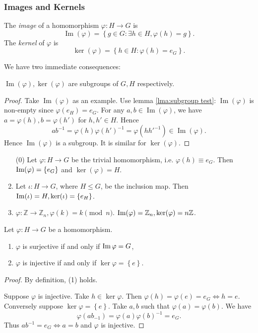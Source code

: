 \documentclass[a4paper]{article}
\begin{document}
\subsubsection{Images and Kernels}
\begin{definition}
  The \textit{image} of a homomorphism $ \varphi: H \to G $ is
  \[
    \operatorname{Im}(\varphi)=\left\{ g\in G: \exists h\in H,
    \varphi(h)=g \right\}
  .\]
  The \textit{kernel} of $ \varphi $ is
  \[
    \ker(\varphi)=\left\{ h\in H: \varphi(h)=e_G \right\}
  .\]
\end{definition}
We have two immediate consequences:
\begin{proposition}\label{prop:ker, im are groups}
  $ \operatorname{Im}(\varphi), \ker (\varphi)  $ are subgroups of
  $G,H$ respectively.
\end{proposition}
\begin{proof}
  Take $ \operatorname{Im}(\varphi) $ as an example. Use lemma
  \ref{lma:subgroup test}: $ \operatorname{Im}(\varphi)  $ is
  non-empty since $ \varphi(e_H)=e_G $. For any $ a,b\in
  \operatorname{Im}(\varphi)  $, we have $ a=\varphi(h),
  b=\varphi(h') $ for $h,h'\in H$. Hence
  \[
    ab^{-1}=\varphi(h)\varphi(h')^{-1}=\varphi(hh'^{-1})\in
    \operatorname{Im}(\varphi)
  .\]
  Hence $ \operatorname{Im}(\varphi)  $ is a subgroup. It is similar
  for $ \ker (\varphi) $.
\end{proof}
\begin{example}
  \begin{enumerate}[(1)]
    \item[(0)] Let $ \varphi:H\to G $ be the trivial homomorphism,
      i.e. $ \varphi(h)\equiv e_G $. Then $ \operatorname{Im}(\varphi)=\left\{
      e_G\right\} $ and $ \ker (\varphi)=H $.
    \item Let $ \iota: H\to G $, where $H\le G$, be the inclusion
      map. Then $ \operatorname{Im} (\iota) = H, \ker (\iota) = \left\{ e_H\right\} $.
    \item $ \varphi: \mathbb{Z} \to \mathbb{Z}_n, \varphi(k)=k \pmod
      n $. $ \operatorname{Im} (\varphi)=\mathbb{Z}_n, \ker (\varphi)= n \mathbb{Z}$.
  \end{enumerate}
\end{example}
\begin{proposition}\label{prop:homom surj}
  Let $ \varphi:H\to G $ be a homomorphism.
  \begin{enumerate}[(1)]
    \item $ \varphi $ is surjective if and only if $ \operatorname{Im} \varphi = G $,
    \item $ \varphi $ is injective if and only if $ \ker \varphi =
      \left\{ e\right\} $.
  \end{enumerate}
\end{proposition}
\begin{proof}
  By definition, (1) holds.

  Suppose $ \varphi $ is injective. Take $ h\in \ker \varphi $. Then
  $ \varphi(h)=\varphi(e)=e_G \Leftrightarrow h=e $. Conversely
  suppose $ \ker \varphi=\left\{ e\right\} $. Take $ a,b $ such that
  $ \varphi(a)=\varphi(b) $. We have
  \[
    \varphi(ab_{-1})=\varphi(a)\varphi(b)^{-1}=e_G
  .\]
  Thus $ ab^{-1}=e_G \Leftrightarrow a=b $ and $ \varphi $ is injective.
\end{proof}
\end{document}

